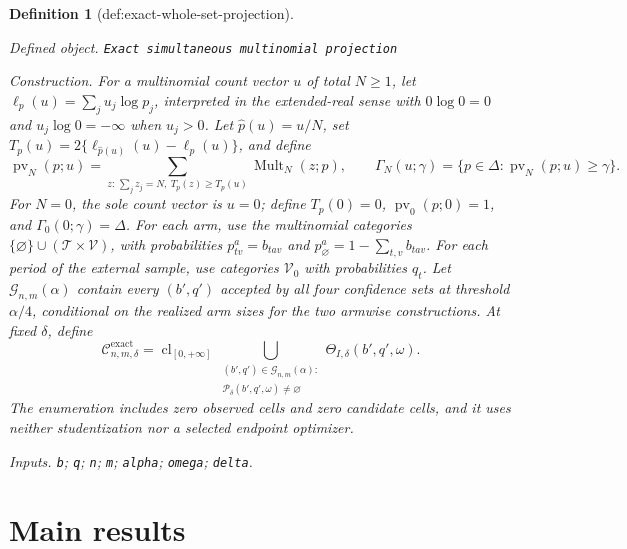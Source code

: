 \documentclass{article}
\newtheorem{definition}{Definition}
\begin{document}
\begin{definition}[def:exact-whole-set-projection]\label{def:exact-whole-set-projection}
\par\smallskip\noindent\emph{Defined object.} \texttt{Exact simultaneous multinomial projection}
\par\smallskip\noindent\emph{Construction.} For a multinomial count vector \(u\) of total \(N\geq 1\), let \(\ell_p(u)=\sum_j u_j\log p_j\), interpreted in the extended-real sense with \(0\log 0=0\) and \(u_j\log 0=-\infty\) when \(u_j>0\). Let \(\widehat p(u)=u/N\), set \(T_p(u)=2\{\ell_{\widehat p(u)}(u)-\ell_p(u)\}\), and define
\[
 \operatorname{pv}_N(p;u)
 =\sum_{z:\,\sum_j z_j=N,\ T_p(z)\geq T_p(u)}
   \operatorname{Mult}_N(z;p),
 \qquad
 \Gamma_N(u;\gamma)=\{p\in\Delta:\operatorname{pv}_N(p;u)\geq\gamma\}.
\]
For \(N=0\), the sole count vector is \(u=0\); define \(T_p(0)=0\), \(\operatorname{pv}_0(p;0)=1\), and \(\Gamma_0(0;\gamma)=\Delta\). For each arm, use the multinomial categories \(\{\varnothing\}\cup(\mathcal T\times\mathcal V)\), with probabilities \(p^a_{tv}=b_{tav}\) and \(p^a_{\varnothing}=1-\sum_{t,v}b_{tav}\). For each period of the external sample, use categories \(\mathcal V_0\) with probabilities \(q_t\). Let \(\mathcal G_{n,m}(\alpha)\) contain every \((b',q')\) accepted by all four confidence sets at threshold \(\alpha/4\), conditional on the realized arm sizes for the two armwise constructions. At fixed \(\delta\), define
\[
 \mathcal C_{n,m,\delta}^{\mathrm{exact}}
 =\operatorname{cl}_{[0,+\infty]}
   \bigcup_{\substack{(b',q')\in\mathcal G_{n,m}(\alpha):\\
                       \mathcal P_\delta(b',q',\omega)\neq\varnothing}}
   \Theta_{I,\delta}(b',q',\omega).
\]
The enumeration includes zero observed cells and zero candidate cells, and it uses neither studentization nor a selected endpoint optimizer.
\par\smallskip\noindent\emph{Inputs.} \texttt{b}; \texttt{q}; \texttt{n}; \texttt{m}; \texttt{alpha}; \texttt{omega}; \texttt{delta}.
\end{definition}

\section{Main results}
\end{document}
